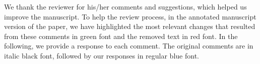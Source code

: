 \documentclass{article}
\begin{document}
\noindent
We thank the reviewer for his/her comments and suggestions, which helped us improve the manuscript. To help the review process, in the annotated manuscript version of the paper, we have highlighted the most relevant changes that resulted from these comments in green font and the removed text in red font. In the following, we provide a response to each comment. The original comments are in italic black font, followed by our responses in regular blue font.
\vspace{2ex}
\newline

%
%

\end{document}
